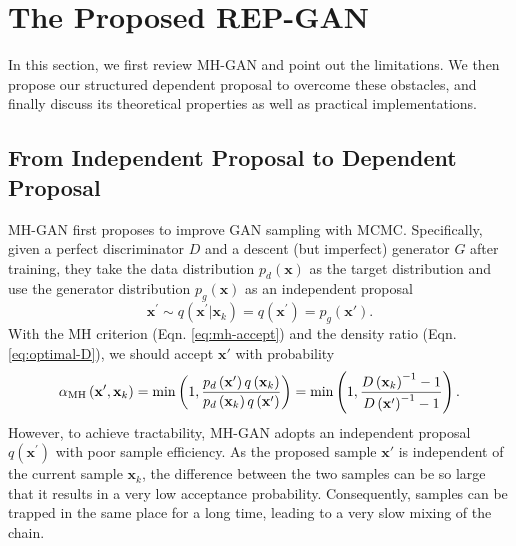 \documentclass[runningheads]{llncs}
\newcommand{\bx}{\mathbf{x}}
\newcommand{\<}{\left\langle}
\renewcommand{\>}{\right\rangle}
\begin{document}
\section{The Proposed REP-GAN}
\label{sec:emhgan}
In this section, we first review MH-GAN and point out the limitations. We then propose our structured dependent proposal to overcome these obstacles, and finally discuss its theoretical properties as well as practical implementations.

\subsection{From Independent Proposal to Dependent Proposal}

MH-GAN \cite{turner2019metropolis} first proposes to improve GAN sampling with MCMC. Specifically, given a perfect discriminator $D$ and a descent (but imperfect) generator $G$ after training, they take the data distribution $p_d(\bx)$ as the target distribution and use the generator distribution $p_g(\bx)$ as an independent proposal
\begin{equation}
\mathbf{x}^{\prime} \sim q\left(\mathbf{x}^{\prime} | \mathbf{x}_{k}\right)=q\left(\mathbf{x}^{\prime}\right)=p_g(\bx').
\label{eq:independence-proposal}
\end{equation}
With the MH criterion (Eqn. \eqref{eq:mh-accept}) and the density ratio (Eqn. \eqref{eq:optimal-D}), we should accept $\bx'$
with probability
\begin{equation}
\alpha_{\rm MH}\left(\mathbf{x}^{\prime}, \mathbf{x}_{k}\right)=\min \left(1, \frac{p_d\left(\mathbf{x}^{\prime}\right) q\left(\mathbf{x}_{k}\right)}{p_d\left(\mathbf{x}_{k}\right) q\left(\mathbf{x}^{\prime}\right)}\right)=\min \left(1, \frac{D\left(\mathbf{x}_{k}\right)^{-1}-1}{D\left(\mathbf{x}^{\prime}\right)^{-1}-1}\right).
\label{eq:mhgan-alpha}
\end{equation}
However, to achieve tractability, MH-GAN adopts an independent proposal $q(\bx^\prime)$ with poor sample efficiency. As the proposed sample $\bx'$ is independent of the current sample $\bx_k$, the difference between the two samples can be so large that it results in a very low acceptance probability. Consequently, samples can be trapped in the same place for a long time, leading to a very slow mixing of the chain. 
\end{document}
